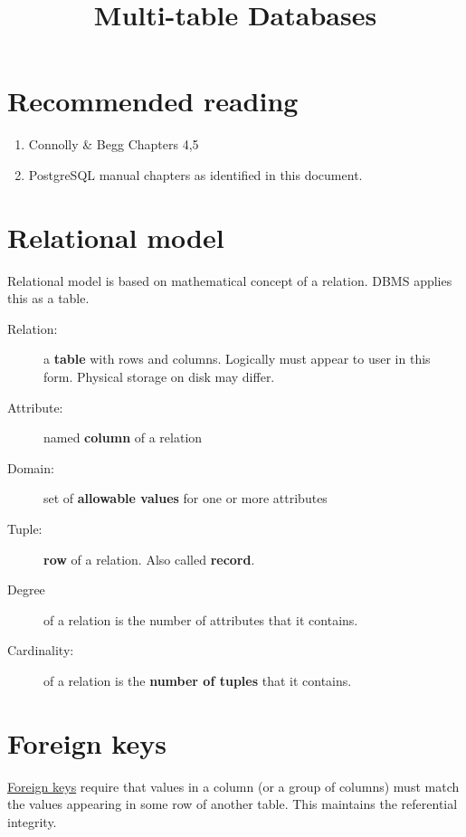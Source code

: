 \documentclass{pgnotes}
\title{Multi-table Databases}
\begin{document}
\maketitle

\section{Recommended reading}

\begin{enumerate}
\item
  Connolly \& Begg Chapters 4,5
\item
  PostgreSQL manual chapters as identified in this document.
\end{enumerate}

\section{Relational model}\label{relational-model}

Relational model is based on mathematical concept of a relation. DBMS
applies this as a table.

\begin{description}
\item[Relation:]
a \textbf{table} with rows and columns. Logically must appear to user in
this form. Physical storage on disk may differ.
\item[Attribute:]
named \textbf{column} of a relation
\item[Domain:]
set of \textbf{allowable values} for one or more attributes
\item[Tuple:]
\textbf{row} of a relation. Also called \textbf{record}.
\item[Degree]
of a relation is the number of attributes that it contains.
\item[Cardinality:]
of a relation is the \textbf{number of tuples} that it contains.
\end{description}

\section{Foreign keys}\label{foreign-keys}

\href{https://www.postgresql.org/docs/13/ddl-constraints.html\#DDL-CONSTRAINTS-FK}{Foreign
keys} require that values in a column (or a group of columns) must match
the values appearing in some row of another table. This maintains the
referential integrity.
\end{document}
